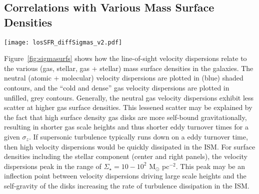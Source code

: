 \documentclass[usletter,fleqn,usenatbib]{mnras}
\begin{document}
\subsection{Correlations with Various Mass Surface Densities}
\begin{figure*}
	\centering
	\texttt{[image: losSFR\_diffSigmas\_v2.pdf]}
	\caption{Distribution of $\sigma_z$ (as Fig.~\ref{fig:tracers}) versus gas surface density ($\Sigma_{\rm gas}$), stellar surface density ($\Sigma_\star$), and total surface density ($\Sigma_{\rm gas}+\Sigma_\star$).  Unfilled contours indicate velocity dispersions and gas surface densities of the cold and dense ($T <500$ K and $n > 1$ cm$^{-3}$) component, with identical data inclusion percentages.  We do not plot below below $\Sigma_{\rm gas} = 0.1$ M$_\odot$ pc$^{-2}$ to ensure at least $\sim 10$ gas elements per pixel for calculating $\sigma_z$.  \textbf{Left:} As neutral gas surface densities exceed $\sim$few M$_\odot$ pc$^{-2}$, the ISM transitions to a predominantly molecular form, and velocity dispersions rise in the cold ISM component. \textbf{Center:} Largest scatter in velocity dispersions occurs for $\log\Sigma_\star \sim 1.5$.  \textbf{Right:} Total surface density--velocity dispersion distribution is very similar to the stellar surface density--velocity distribution in neutral gas, but for cold and dense gas there is a steeper rise in dispersions (and generally cold gas content) around total surface densities of $\sim$10 M$_\odot$ pc$^{-2}$. Generally higher neutral gas surface densities have a lower scatter to high dispersions, whereas the cold and dense gas velocity dispersions consistently rise with increasing gas and stellar surface densities.}
	\label{fig:sigmasurfs}
\end{figure*}
Figure~\ref{fig:sigmasurfs} shows how the line-of-sight velocity dispersions relate to the various (gas, stellar, gas + stellar) mass surface densities in the galaxies.  The neutral (atomic + molecular) velocity dispersions are plotted in (blue) shaded contours, and the ``cold and dense'' gas velocity dispersions are plotted in unfilled, grey contours.  Generally, the neutral gas velocity dispersions exhibit less scatter at higher gas surface densities.  This lessened scatter may be explained by the fact that high surface density gas disks are more self-bound gravitationally, resulting in shorter gas scale heights and thus shorter eddy turnover times for a given $\sigma_z$.  If supersonic turbulence typically runs down on a eddy turnover time, then high velocity dispersions would be quickly dissipated in the ISM. For surface densities including the stellar component (center and right panels), the velocity dispersions peak in the range of $\Sigma_\star = 10 - 10^2$ M$_\odot$ pc$^{-2}$.  This peak may be an inflection point between velocity dispersions driving large scale heights and the self-gravity of the disks increasing the rate of turbulence dissipation in the ISM.
\end{document}
